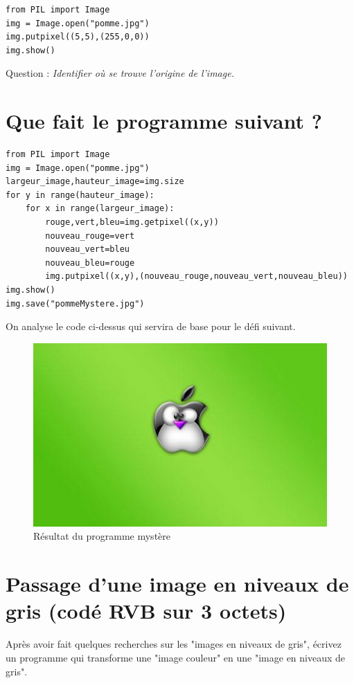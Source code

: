 \documentclass[11pt]{article}
\begin{document}
\begin{verbatim}
from PIL import Image
img = Image.open("pomme.jpg")
img.putpixel((5,5),(255,0,0))
img.show()
\end{verbatim}

Question : \emph{Identifier où se trouve l'origine de l'image.}


\section{Que fait le programme suivant ?}
\label{sec:org1b6e758}

\begin{verbatim}
from PIL import Image
img = Image.open("pomme.jpg")
largeur_image,hauteur_image=img.size
for y in range(hauteur_image):
    for x in range(largeur_image):
        rouge,vert,bleu=img.getpixel((x,y))
        nouveau_rouge=vert
        nouveau_vert=bleu
        nouveau_bleu=rouge
        img.putpixel((x,y),(nouveau_rouge,nouveau_vert,nouveau_bleu))
img.show()
img.save("pommeMystere.jpg")
\end{verbatim}


On analyse le code ci-dessus qui servira de base pour le défi suivant.

\begin{figure}[htbp]
\centering
\includegraphics[width=.9\linewidth]{pommeMystere.jpg}
\caption{Résultat du programme mystère}
\end{figure}


\section{Passage d'une image en niveaux de gris (codé RVB sur 3 octets)}
\label{sec:org9ad7c29}

Après avoir fait quelques recherches sur les "images en niveaux de gris", écrivez un programme qui transforme une "image couleur" en une "image en niveaux de gris".
\end{document}
